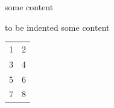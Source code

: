 some content %

to be indented
some content %

\begin{tabular}{cc}
	1 & 2 \\
	3 & 4 \\
	5&6\\%
	7 & 8 \\
\end{tabular}
